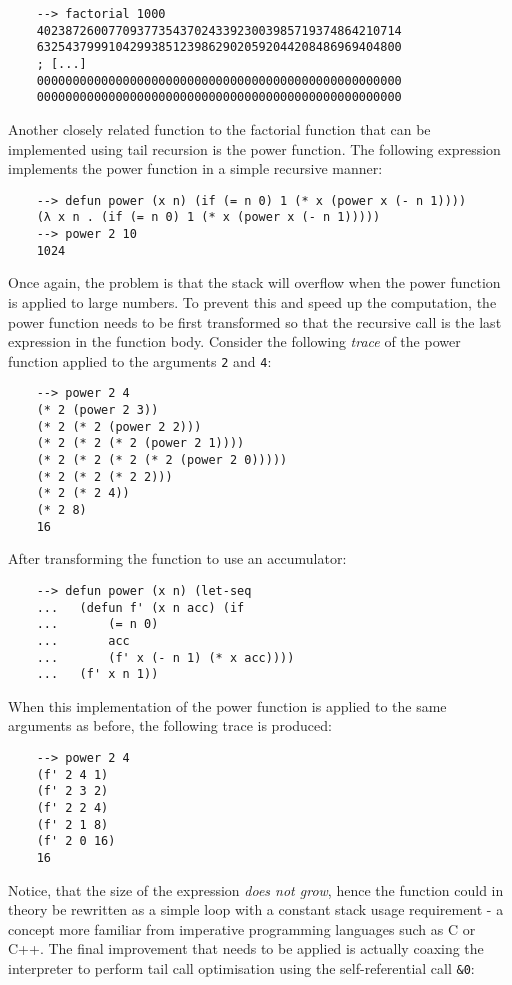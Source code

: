 \begin{Verbatim}
    --> factorial 1000
    402387260077093773543702433923003985719374864210714
    632543799910429938512398629020592044208486969404800
    ; [...]
    000000000000000000000000000000000000000000000000000
    000000000000000000000000000000000000000000000000000
\end{Verbatim}

Another closely related function to the factorial function that can be implemented using tail recursion is the power function. The following expression implements the power function in a simple recursive manner:

\begin{Verbatim}
    --> defun power (x n) (if (= n 0) 1 (* x (power x (- n 1))))
    (λ x n . (if (= n 0) 1 (* x (power x (- n 1)))))
    --> power 2 10
    1024
\end{Verbatim}

Once again, the problem is that the stack will overflow when the power function is applied to large numbers. To prevent this and speed up the computation, the power function needs to be first transformed so that the recursive call is the last expression in the function body. Consider the following \textit{trace} of the power function applied to the arguments \verb|2| and \verb|4|:

\begin{Verbatim}
    --> power 2 4
    (* 2 (power 2 3))
    (* 2 (* 2 (power 2 2)))
    (* 2 (* 2 (* 2 (power 2 1))))
    (* 2 (* 2 (* 2 (* 2 (power 2 0)))))
    (* 2 (* 2 (* 2 2)))
    (* 2 (* 2 4))
    (* 2 8)
    16
\end{Verbatim}

After transforming the function to use an accumulator:

\begin{Verbatim}
    --> defun power (x n) (let-seq
    ...   (defun f' (x n acc) (if
    ...       (= n 0)
    ...       acc
    ...       (f' x (- n 1) (* x acc))))
    ...   (f' x n 1))
\end{Verbatim}

When this implementation of the power function is applied to the same arguments as before, the following trace is produced:

\begin{Verbatim}
    --> power 2 4
    (f' 2 4 1)
    (f' 2 3 2)
    (f' 2 2 4)
    (f' 2 1 8)
    (f' 2 0 16)
    16
\end{Verbatim}

Notice, that the size of the expression \textit{does not grow}, hence the function could in theory be rewritten as a simple loop with a constant stack usage requirement - a concept more familiar from imperative programming languages such as C or C++. The final improvement that needs to be applied is actually coaxing the interpreter to perform tail call optimisation using the self-referential call \verb|&0|:

